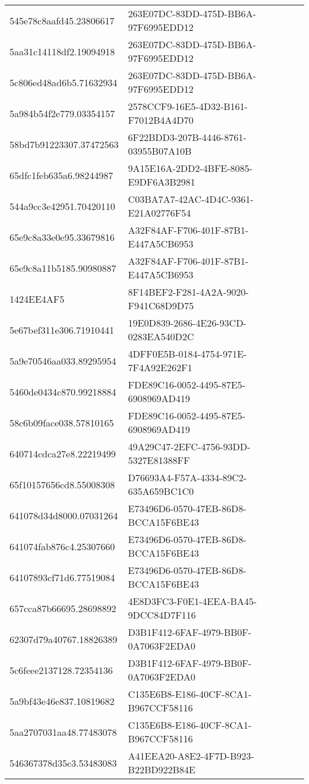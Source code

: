 \begin{tabular}{ll}
545e78c8aafd45.23806617 & 263E07DC-83DD-475D-BB6A-97F6995EDD12 \\
5aa31c14118df2.19094918 & 263E07DC-83DD-475D-BB6A-97F6995EDD12 \\
5c806ed48ad6b5.71632934 & 263E07DC-83DD-475D-BB6A-97F6995EDD12 \\
5a984b54f2e779.03354157 & 2578CCF9-16E5-4D32-B161-F7012B4A4D70 \\
58bd7b91223307.37472563 & 6F22BDD3-207B-4446-8761-03955B07A10B \\
65dfc1feb635a6.98244987 & 9A15E16A-2DD2-4BFE-8085-E9DF6A3B2981 \\
544a9cc3e42951.70420110 & C03BA7A7-42AC-4D4C-9361-E21A02776F54 \\
65e9c8a33e0e95.33679816 & A32F84AF-F706-401F-87B1-E447A5CB6953 \\
65e9c8a11b5185.90980887 & A32F84AF-F706-401F-87B1-E447A5CB6953 \\
1424EE4AF5 & 8F14BEF2-F281-4A2A-9020-F941C68D9D75 \\
5e67bef311e306.71910441 & 19E0D839-2686-4E26-93CD-0283EA540D2C \\
5a9e70546aa033.89295954 & 4DFF0E5B-0184-4754-971E-7F4A92E262F1 \\
5460de0434c870.99218884 & FDE89C16-0052-4495-87E5-6908969AD419 \\
58c6b09face038.57810165 & FDE89C16-0052-4495-87E5-6908969AD419 \\
640714cdca27e8.22219499 & 49A29C47-2EFC-4756-93DD-5327E81388FF \\
65f10157656cd8.55008308 & D76693A4-F57A-4334-89C2-635A659BC1C0 \\
641078d34d8000.07031264 & E73496D6-0570-47EB-86D8-BCCA15F6BE43 \\
641074fab876c4.25307660 & E73496D6-0570-47EB-86D8-BCCA15F6BE43 \\
64107893cf71d6.77519084 & E73496D6-0570-47EB-86D8-BCCA15F6BE43 \\
657cca87b66695.28698892 & 4E8D3FC3-F0E1-4EEA-BA45-9DCC84D7F116 \\
62307d79a40767.18826389 & D3B1F412-6FAF-4979-BB0F-0A7063F2EDA0 \\
5c6feee2137128.72354136 & D3B1F412-6FAF-4979-BB0F-0A7063F2EDA0 \\
5a9bf43e46e837.10819682 & C135E6B8-E186-40CF-8CA1-B967CCF58116 \\
5aa2707031aa48.77483078 & C135E6B8-E186-40CF-8CA1-B967CCF58116 \\
546367378d35c3.53483083 & A41EEA20-A8E2-4F7D-B923-B22BD922B84E \\

\end{tabular}
